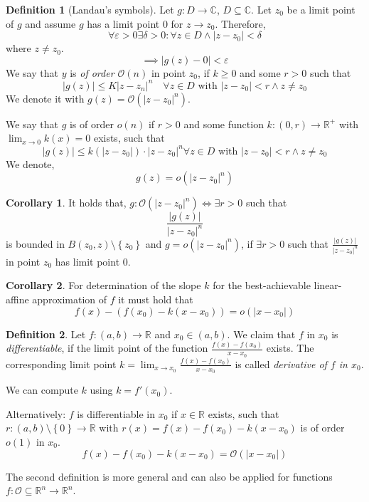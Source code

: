 \documentclass[a4paper,landscape,twocolumn]{article}
\theoremstyle{definition}
\newtheorem{defi}{Definition}
\newtheorem{cor}{Corollary}
\newcommand\set[1]{\left\{#1\right\}}
\newcommand\abs[1]{\left|#1\right|}
\begin{document}
\begin{defi}[Landau's symbols]
  Let $g: D \to \mathbb C$, $D \subseteq \mathbb C$.
  Let $z_0$ be a limit point of $g$ and assume $g$ has a limit point $0$ for $z \to z_0$.
  Therefore,
  \[ \forall \varepsilon > 0 \exists \delta > 0: \forall z \in D \land \abs{z - z_0} < \delta \]
  where $z \neq z_0$.
  \[ \implies \abs{g(z) - 0} < \varepsilon \]
  We say that $y$ is \emph{of order $\mathcal{O}(n)$} in point $z_0$,
  if $k \geq 0$ and some $r > 0$ such that
  \[ \abs{g(z)} \leq K \abs{z - z_n}^n \quad\forall z \in D \text{ with } \abs{z - z_0} < r \land z \neq z_0 \]
  We denote it with $g(z) = \mathcal O(\abs{z - z_0}^n)$.

  We say that $g$ is of order $o(n)$ if $r > 0$ and some function $k: (0, r) \to \mathbb R^+$
  with $\lim_{x\to 0} k(x) = 0$ exists, such that
  \[
    \abs{g(z)} \leq k(\abs{z - z_0}) \cdot \abs{z - z_0}^n
    \forall z \in D \text{ with } \abs{z - z_0} < r \land z \neq z_0
  \]
  We denote,
  \[ g(z) = o(\abs{z - z_0}^n) \]
\end{defi}
\begin{cor}
  It holds that,
  $g: \mathcal O(\abs{z - z_0}^n) \iff \exists r > 0$ such that
  \[ \frac{\abs{g(z)}}{\abs{z - z_0}^n} \]
  is bounded in $B(z_0, z) \setminus \set{z_0}$ and $g = o(\abs{z - z_0}^n)$,
  if $\exists r > 0$ such that $\frac{\abs{g(z)}}{\abs{z - z_0}^n}$ in point
  $z_0$ has limit point $0$.
\end{cor}
\begin{cor}
  For determination of the slope $k$ for the best-achievable linear-affine approximation
  of $f$ it must hold that
  \[ f(x) - (f(x_0) - k (x - x_0)) = o(\abs{x - x_0}) \]
\end{cor}
\begin{defi}
  Let $f: (a, b) \to \mathbb R$ and $x_0 \in (a, b)$. We claim that $f$ in $x_0$
  is \emph{differentiable}, if the limit point of the function $\frac{f(x) - f(x_0)}{x - x_0}$
  exists. The corresponding limit point $k = \lim_{x\to x_0} \frac{f(x) - f(x_0)}{x - x_0}$
  is called \emph{derivative of $f$ in $x_0$}.

  We can compute $k$ using $k = f'(x_0)$.

  Alternatively: $f$ is differentiable in $x_0$ if $x \in \mathbb R$ exists,
  such that
  $r: (a, b) \setminus \set{0} \to \mathbb R$
  with
  $r(x)  = f(x) - f(x_0) - k(x - x_0)$
  is of order $o(1)$ in $x_0$.
  \[ f(x) - f(x_0) - k(x - x_0) = \mathcal O(\abs{x - x_0}) \]

  The second definition is more general and can also be applied for functions
  $f: \mathcal O \subseteq \mathbb R^n \to \mathbb R^n$.
\end{defi}
\end{document}
